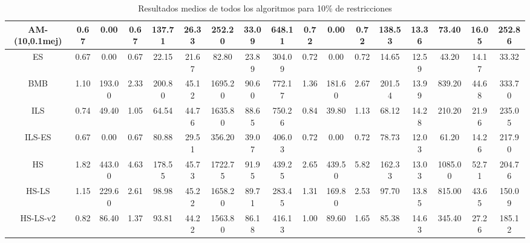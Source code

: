 \begin{table}[H]
{{\begin{tabular}{|| c || c c c c || c c c c || c c c c || c c c c ||}
        \hline
        AM-(10,0.1mej) & 0.67 & 0.00 & 0.67 & 137.71 & 26.33 & 252.20 & 33.09 & 648.11 & 0.72 & 0.00 & 0.72 & 138.53 & 13.36 & 73.40 & 16.05 & 252.86\\
        \hline
        \hline
        ES &
        0.67 & 0.00 & 0.67 & 22.15 & 21.67 & 82.80 & 23.89 & 304.09 & 0.72 & 0.00 & 0.72 & 14.65 & 12.59 & 43.20 & 14.17 & 33.32
        \\
        \hline
        BMB &
        1.10 & 193.00 & 2.33 & 200.80 & 45.12 & 1695.20 & 90.60 & 772.17 & 1.36 & 181.60 & 2.67 & 201.54 & 13.99 & 839.20 & 44.68 & 333.70
        \\
        \hline
        ILS &
        0.74 & 49.40 & 1.05 & 64.54 & 44.76 & 1635.80 & 88.65 & 750.26 & 0.84 & 39.80 & 1.13 & 68.12 & 14.28 & 210.20 & 21.96 & 235.05
        \\
        \hline
        ILS-ES &
        0.67 & 0.00 & 0.67 & 80.88 & 29.51 & 356.20 & 39.07 & 406.03 & 0.72 & 0.00 & 0.72 & 78.73 & 12.03 & 61.20 & 14.26 & 217.90
        \\
        \hline \hline
        HS &
        1.82 & 443.00 & 4.63 & 178.55 & 45.73 & 1722.75 & 91.95 & 439.25 & 2.65 & 439.50 & 5.82 & 162.33 & 13.03 & 1085.00 & 52.71 & 204.76
        \\
        \hline
        HS-LS &
        1.15 & 229.60 & 2.61 & 98.98 & 45.22 & 1658.20 & 89.71 & 283.45 & 1.31 & 169.80 & 2.53 & 97.70 & 13.85 & 815.00 & 43.65 & 150.09
        \\
        \hline
        HS-LS-v2 &
        0.82 & 86.40 & 1.37 & 93.81 & 44.22 & 1563.80 & 86.18 & 416.13 & 1.00 & 89.60 & 1.65 & 85.38 & 14.63 & 345.40 & 27.26 & 185.12
        \\        
        \hline
    \end{tabular}
    }
    }
    \caption{Resultados medios de todos los algoritmos para 10\% de restricciones}
\end{table}

